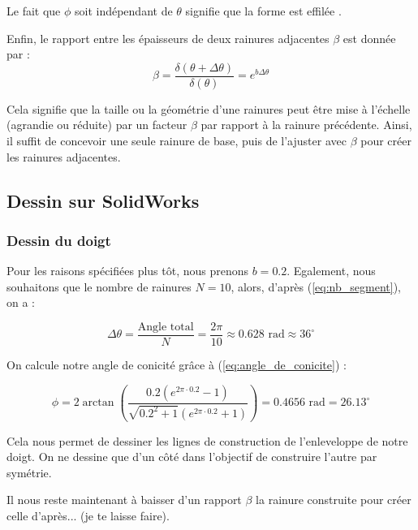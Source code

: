 \documentclass[a4paper, 11pt]{report}
\begin{document}
            Le fait que $\phi$ soit indépendant de $\theta$ signifie que la forme est effilée \cite{wang_spirobs_2025}.

            Enfin, le rapport entre les épaisseurs de deux rainures adjacentes \(\beta\) est donnée par :
            \begin{equation}
            \beta = \frac{\delta(\theta + \Delta\theta)}{\delta(\theta)} = e^{b \Delta\theta}
            \label{eq:beta}
            \end{equation}
            
            Cela signifie que la taille ou la géométrie d’une rainures peut être mise à l’échelle (agrandie ou réduite) par un facteur $\beta$ par rapport à la rainure précédente. Ainsi, il suffit de concevoir une seule rainure de base, puis de l’ajuster avec $\beta$ pour créer les rainures adjacentes.
        
    \subsection{Dessin sur SolidWorks}

        \subsubsection{Dessin du doigt}

            Pour les raisons spécifiées plus tôt, nous prenons $b = 0.2$. Egalement, nous souhaitons que le nombre de rainures $N = 10$, alors, d'après (\ref{eq:nb_segment}), on a :

            \[
            \Delta\theta= \frac{\text{Angle total}}{N} = \frac{2\pi}{10} \approx 0.628 \text{ rad} \approx 36^{\circ}
            \]
            
            On calcule notre angle de conicité grâce à (\ref{eq:angle_de_conicite}) :
            
            \[
            \phi = 2 \arctan\left( \frac{0.2\left(e^{2\pi \cdot 0.2} - 1\right)}{\sqrt{0.2^2 + 1} \left(e^{2\pi \cdot 0.2} + 1\right)} \right)
            = 0.4656 \text{ rad}
            = 26.13^{\circ}
            \]

            Cela nous permet de dessiner les lignes de construction de l'enleveloppe de notre doigt. On ne dessine que d'un côté dans l'objectif de construire l'autre par symétrie.

            Il nous reste maintenant à baisser d'un rapport $\beta$ la rainure construite pour créer celle d'après... (je te laisse faire).
            
\end{document}
